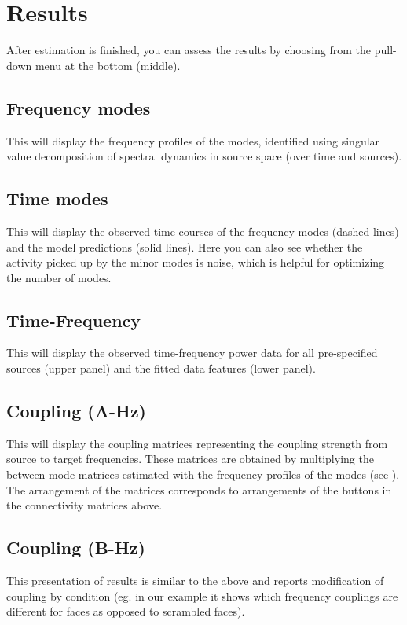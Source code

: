 \section{Results}
After estimation is finished, you can assess the results by choosing from the pull-down menu at the bottom (middle).

\subsection{Frequency modes}
This will display the frequency profiles of the modes, identified using singular value decomposition of spectral dynamics in source space (over time and sources).

\subsection{Time modes}
This will display the observed time courses of the frequency modes (dashed lines) and the model predictions (solid lines). Here you can also see whether the activity picked up by the minor modes is noise, which is helpful for optimizing the number of modes. 

\subsection{Time-Frequency}
This will display the observed time-frequency power data for all pre-specified sources (upper panel) and the fitted data features (lower panel).

\subsection{Coupling (A-Hz)}
This will display the coupling matrices representing the coupling strength from source to target frequencies. These matrices are obtained by multiplying the between-mode matrices estimated with the frequency profiles of the modes (see \cite{cc_induced}). The arrangement of the matrices corresponds to arrangements of the buttons in the connectivity matrices above.

\subsection{Coupling (B-Hz)}
This presentation of results is similar to the above and reports modification of coupling by condition (eg. in our example it shows which frequency couplings are different for faces as opposed to scrambled faces). 


